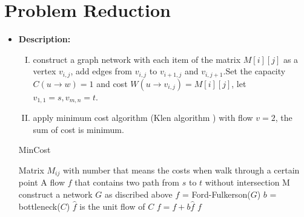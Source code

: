 \section{Problem Reduction}

\begin{itemize}
	\item \textbf{Description:} 
		\begin{enumerate}[I.] 
		 \item construct a graph network with each item of the matrix
		 $M[i][j]$ as a vertex $v_{i,j}$,
		 add edges from $v_{i,j}$ to $v_{i+1,j}$ and
		 $v_{i, j+1}$.Set the capacity $C(u\rightarrow w) = 1$
		 and cost $W(u\rightarrow v_{i,j}) = M[i][j]$,
		 let $v_{1,1} = s,v_{m,n} = t$.
		\item apply minimum cost algorithm (Klen algorithm ) with flow $v = 2$, the sum of cost is minimum.
		\end{enumerate} 
		\begin{algorithm}[H]
			\caption{MinCost}
			\begin{algorithmic}[1]
				\Require  Matrix $M_{ij}$ with number that means the costs when walk through a certain point
				\Ensure   A flow $f$ that contains two path from $s$ to  $t$ without intersection
				 {M}
				\State construct a network $G$ as discribed above
				\State $f$ = Ford-Fulkerson($G$)
					\State $b$ = bottleneck($C$)
					\State $\hat{f}$ is the unit flow of $C$
					\State $f = f + b\hat{f}$
				\EndWhile 
				\State\Return $f$
				\EndFunction 
			\end{algorithmic} 
		\end{algorithm}			
		

\end{itemize}
